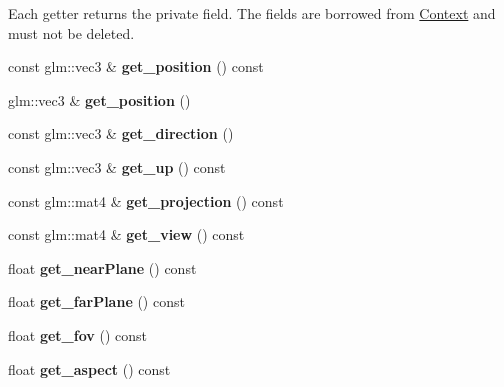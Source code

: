 \begin{Indent}
{Each getter returns the private field. The fields are borrowed from \hyperlink{classblaze_1_1Context}{Context} and must not be deleted. }\begin{DoxyCompactItemize}
\item 
\mbox{\label{classblaze_1_1Camera_aabab289c1d8e04959da4926b37bb4573}} 
const glm\+::vec3 \& {\bfseries get\+\_\+position} () const
\item 
\mbox{\label{classblaze_1_1Camera_ab3553272b6f873c88ce8af339674fc77}} 
glm\+::vec3 \& {\bfseries get\+\_\+position} ()
\item 
\mbox{\label{classblaze_1_1Camera_afa8c3e20e08ed5447e55eb25c4c7228a}} 
const glm\+::vec3 \& {\bfseries get\+\_\+direction} ()
\item 
\mbox{\label{classblaze_1_1Camera_a6667bc0cd8f69dbe41c399a692865d1e}} 
const glm\+::vec3 \& {\bfseries get\+\_\+up} () const
\item 
\mbox{\label{classblaze_1_1Camera_aa97ab263851b4e795db524cbb097a305}} 
const glm\+::mat4 \& {\bfseries get\+\_\+projection} () const
\item 
\mbox{\label{classblaze_1_1Camera_a888fe8983146efeab92be654762d70d0}} 
const glm\+::mat4 \& {\bfseries get\+\_\+view} () const
\item 
\mbox{\label{classblaze_1_1Camera_ab5df30f10e4b0ad1f0e5a8cfecfd4e99}} 
float {\bfseries get\+\_\+near\+Plane} () const
\item 
\mbox{\label{classblaze_1_1Camera_a9b30a18886cdaf2f09d769db3a68d140}} 
float {\bfseries get\+\_\+far\+Plane} () const
\item 
\mbox{\label{classblaze_1_1Camera_a9ae74a9c755d8c97db5a36ac54047c4c}} 
float {\bfseries get\+\_\+fov} () const
\item 
\mbox{\label{classblaze_1_1Camera_aa665b6e0c875012aca0612b72989f961}} 
float {\bfseries get\+\_\+aspect} () const
\end{DoxyCompactItemize}
\end{Indent}


